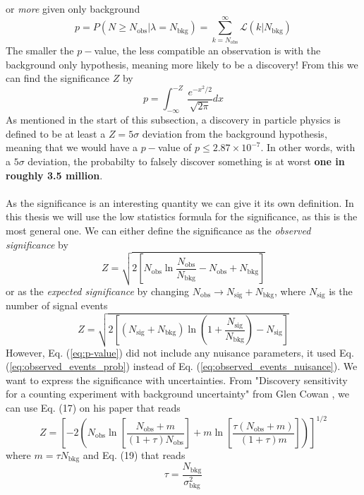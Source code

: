\documentclass[14pt, a4paper]{book}
\begin{document}
or \textit{more} given only background
\begin{equation}\label{eq:p-value}
    p = P(N\ge N_{\text{obs}}\vert \lambda = N_{\text{bkg}}) = \sum_{k=N_{\text{obs}}}^{\infty}\mathcal{L}(k\vert N_{\text{bkg}})
\end{equation}
The smaller the $p-$value, the less compatible an observation is with the background only hypothesis, meaning more likely to be a discovery! From this we can find the significance $Z$ by
$$
    p = \int_{-\infty}^{-Z} \frac{e^{-x^2/2}}{\sqrt{2\pi}}dx
$$
As mentioned in the start of this subsection, a discovery in particle physics is defined to be at least a $Z=5\sigma$ deviation from the background hypothesis, meaning that we would have a $p-$value of $p\le2.87\times10^{-7}$. In other words, with a $5\sigma$ deviation, the probabilty to 
falsely discover something is at worst \textbf{one in roughly 3.5 million}.\\ 
\\As the significance is an interesting quantity we can give it its own definition. In this thesis we will use the low statistics formula for the significance, as this is the most general one. We can either define the significance as the \textit{observed significance} by
\begin{equation}\label{eq:obs_sig}
    Z = \sqrt{2\left[N_{\text{obs}}\ln\frac{N_{\text{obs}}}{N_{\text{bkg}}}-N_{\text{obs}}+N_{\text{bkg}}\right]}
\end{equation}
or as the \textit{expected significance} by changing $N_{\text{obs}} \rightarrow N_{\text{sig}}+N_{\text{bkg}}$, where $N_{\text{sig}}$ is the number of signal events
\begin{equation}\label{eq:exp_sig}
    Z = \sqrt{2\left[(N_{\text{sig}}+N_{\text{bkg}})\ln\left(1+\frac{N_{\text{sig}}}{N_{\text{bkg}}}\right)-N_{\text{sig}}\right]}
\end{equation}
However, Eq. (\ref{eq:p-value}) did not include any nuisance parameters, it used Eq. (\ref{eq:observed_events_prob}) instead of Eq. (\ref{eq:observed_events_nuisance}). We want to express the significance with uncertainties. From "Discovery sensitivity for a counting experiment with background uncertainty" from Glen Cowan 
\cite{Cowan_Uncertainty_in_sig}, we can use Eq. (17) on his paper that reads
$$
Z = \left[-2\left(N_{\text{obs}}\ln\left[\frac{N_{\text{obs}}+m}{(1+\tau)N_{\text{obs}}}\right] + m\ln\left[\frac{\tau(N_{\text{obs}}+m)}{(1+\tau)m}\right]\right)\right]^{1/2}
$$
where $m=\tau N_{\text{bkg}}$ and Eq. (19) that reads
$$
\tau=\frac{N_{\text{bkg}}}{\sigma_{\text{bkg}}^2}
$$
\end{document}
